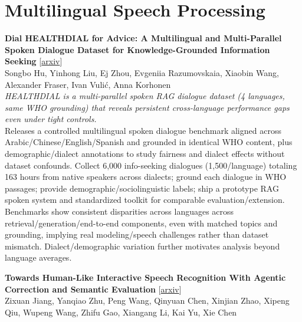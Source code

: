 \documentclass[12pt,letterpaper]{article}
\begin{document}
\medskip


\section*{Multilingual Speech Processing}

{\small\textbf{Dial HEALTHDIAL for Advice: A Multilingual and Multi-Parallel Spoken Dialogue Dataset for Knowledge-Grounded Information Seeking}} {\scriptsize[\href{https://arxiv.org/abs/2605.30107}{arxiv}]}\\
{\scriptsize Songbo Hu, Yinhong Liu, Ej Zhou, Evgeniia Razumovskaia, Xiaobin Wang, Alexander Fraser, Ivan Vulić, Anna Korhonen}\\

{\small\textit{HEALTHDIAL is a multi-parallel spoken RAG dialogue dataset (4 languages, same WHO grounding) that reveals persistent cross-language performance gaps even under tight controls.}}\\[1pt]
{\footnotesize Releases a controlled multilingual spoken dialogue benchmark aligned across Arabic/Chinese/English/Spanish and grounded in identical WHO content, plus demographic/dialect annotations to study fairness and dialect effects without dataset confounds. Collect 6,000 info-seeking dialogues (1,500/language) totaling 163 hours from native speakers across dialects; ground each dialogue in WHO passages; provide demographic/sociolinguistic labels; ship a prototype RAG spoken system and standardized toolkit for comparable evaluation/extension. Benchmarks show consistent disparities across languages across retrieval/generation/end-to-end components, even with matched topics and grounding, implying real modeling/speech challenges rather than dataset mismatch. Dialect/demographic variation further motivates analysis beyond language averages.}

\medskip

{\small\textbf{Towards Human-Like Interactive Speech Recognition With Agentic Correction and Semantic Evaluation}} {\scriptsize[\href{https://arxiv.org/abs/2605.29430}{arxiv}]}\\
{\scriptsize Zixuan Jiang, Yanqiao Zhu, Peng Wang, Qinyuan Chen, Xinjian Zhao, Xipeng Qiu, Wupeng Wang, Zhifu Gao, Xiangang Li, Kai Yu, Xie Chen}\\
\end{document}
